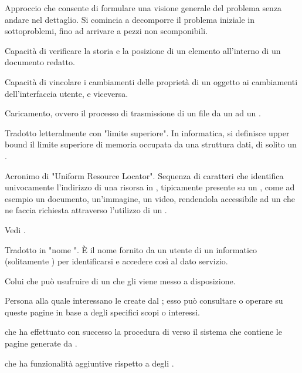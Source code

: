 {Approccio che consente di formulare una visione generale del problema senza andare nel dettaglio. Si comincia a decomporre il problema iniziale in sottoproblemi, fino ad arrivare a pezzi non scomponibili.}

{Capacità di verificare la storia e la posizione di un elemento all'interno di un documento redatto.}

{Capacità di vincolare i cambiamenti delle proprietà di un oggetto ai cambiamenti dell'interfaccia utente, e viceversa.}



{Caricamento, ovvero il processo di trasmissione di un file da un  ad un .}

{Tradotto letteralmente con "limite superiore". In informatica, si definisce upper bound il limite superiore di memoria occupata da una struttura dati, di solito un .}

{Acronimo di "Uniform Resource Locator". Sequenza di caratteri che identifica univocamente l'indirizzo di una risorsa in , tipicamente presente su un  , come ad esempio un documento, un'immagine, un video, rendendola accessibile ad un  che ne faccia richiesta attraverso l'utilizzo di un  .}

{Vedi .}

{Tradotto in "nome ". \`{E} il nome fornito da un utente di un  informatico (solitamente ) per identificarsi e accedere così al dato servizio.}

{Colui che può usufruire di un  che gli viene messo a disposizione.}

{Persona alla quale interessano le  create dal  ; esso può consultare o operare su queste pagine in base a degli specifici scopi o interessi.}

{ che ha effettuato con successo la procedura di  verso il sistema che contiene le pagine generate da .}

{ che ha funzionalità aggiuntive rispetto a degli .}

